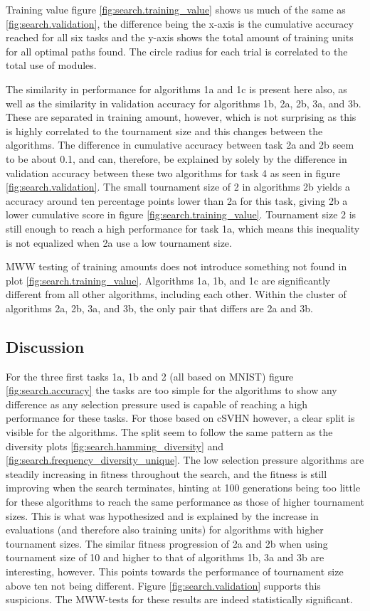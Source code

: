 Training value figure \ref{fig:search.training_value} shows us much of the same as \ref{fig:search.validation}, the difference being the x-axis is the cumulative accuracy reached for all six tasks and the y-axis shows the total amount of training units for all optimal paths found. The circle radius for each trial is correlated to the total use of modules. 

The similarity in performance for algorithms 1a and 1c is present here also, as well as the similarity in validation accuracy for algorithms 1b, 2a, 2b, 3a, and 3b. These are separated in training amount, however, which is not surprising as this is highly correlated to the tournament size and this changes between the algorithms. The difference in cumulative accuracy between task 2a and 2b seem to be about 0.1, and can, therefore, be explained by solely by the difference in validation accuracy between these two algorithms for task 4 as seen in figure \ref{fig:search.validation}. The small tournament size of 2 in algorithms 2b yields a accuracy around ten percentage points lower than 2a for this task, giving 2b a lower cumulative score in figure \ref{fig:search.training_value}. Tournament size 2 is still enough to reach a high performance for task 1a, which means this inequality is not equalized when 2a use a low tournament size. 

MWW testing of training amounts does not introduce something not found in plot \ref{fig:search.training_value}. Algorithms 1a, 1b, and 1c are significantly different from all other algorithms, including each other. Within the cluster of algorithms 2a, 2b, 3a, and 3b, the only pair that differs are 2a and 3b. 

\subsection{Discussion}
For the three first tasks 1a, 1b and 2 (all based on MNIST) figure \ref{fig:search.accuracy} the tasks are too simple for the algorithms to show any difference as any selection pressure used is capable of reaching a high performance for these tasks. For those based on cSVHN however, a clear split is visible for the algorithms. The split seem to follow the same pattern as the diversity plots \ref{fig:search.hamming_diversity} and \ref{fig:search.frequency_diversity_unique}. The low selection pressure algorithms are steadily increasing in fitness throughout the search, and the fitness is still improving when the search terminates, hinting at 100 generations being too little for these algorithms to reach the same performance as those of higher tournament sizes. This is what was hypothesized and is explained by the increase in evaluations (and therefore also training units) for algorithms with higher tournament sizes. The similar fitness progression of 2a and 2b when using tournament size of 10 and higher to that of algorithms 1b, 3a and 3b are interesting, however. This points towards the performance of tournament size above ten not being different. Figure \ref{fig:search.validation} supports this suspicions. The MWW-tests for these results are indeed statistically significant.

